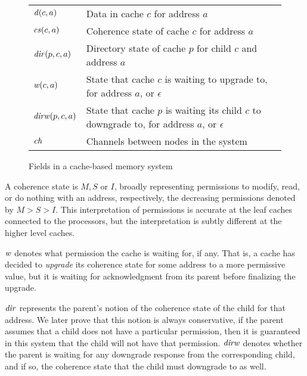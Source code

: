 \begin{figure}[h]
\centering
\begin{tabular}{|l|p{6cm}|}
\hline
$\mathit{d}(c,a)$ & Data in cache $c$ for address $a$\\
$\mathit{cs}(c,a)$ & Coherence state of cache $c$ for address $a$\\
$\mathit{dir}(p,c,a)$ & Directory state of cache $p$ for child $c$ and address $a$\\
$\mathit{w}(c,a)$ & State that cache $c$ is waiting to upgrade to, for address $a$, or $\epsilon$\\ %
$\mathit{dirw}(p,c,a)$ & State that cache $p$ is waiting its child $c$ to downgrade to, for address $a$, or $\epsilon$\\
$\mathit{ch}$ & Channels between nodes in the system\\
\hline
\end{tabular}
\caption{Fields in a cache-based memory system}
\label{fields}
\end{figure}

A coherence state is $M, S$ or $I$, broadly representing permissions to modify,
read, or do nothing with an address, respectively, the decreasing permissions
denoted by $M > S > I$. This interpretation of permissions is accurate at the
leaf caches connected to the processors, but the
interpretation is subtly different at the higher level caches.

$\mathit{w}$ denotes what permission the cache is waiting for,
if any.  That is, a cache has decided to \emph{upgrade} its
coherence state for some address to a more permissive value, but
it is waiting for acknowledgment from its parent before
finalizing the upgrade.

$\mathit{dir}$ represents the parent's notion of the
coherence state of the child for that address. We later prove that this notion
is always conservative, \ie{} if the parent assumes that a child does not have
a particular permission, then it is guaranteed in this system that the child
will not have that permission.  $\mathit{dirw}$
denotes whether the parent is waiting for any downgrade response from the
corresponding child, and if so, the coherence state that the child must
downgrade to as well.


